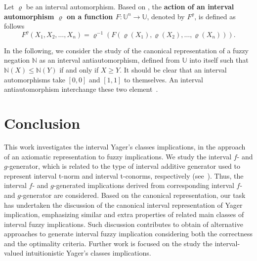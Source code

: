 \documentclass[conference]{IEEEtran}
\theoremstyle{plain}
\theoremstyle{remark}
\theoremstyle{definition}
\theoremstyle{proposition}
\begin{document}
Let $\varrho$ be an interval automorphism. Based on
\cite{BT06a,BDSR10}, the \textbf{action of an interval
automorphism $\varrho$ on a function $F: \mathbb{U}^{n}\rightarrow
\mathbb{U}$}, denoted by $F^{\varrho}$, is defined as follows
\begin{equation} \label{eq-aut-imp-int}
F^\varrho(X_1,X_2, \ldots
,X_n)=\varrho^{-1}(F(\varrho(X_1),\varrho(X_2), \ldots
,\varrho(X_n))).
\end{equation}

In the following, we consider the study of the canonical
representation of a fuzzy negation $\mathbb{N}$ as an interval
antiautomorphism, defined from $\mathbb{U}$ into itself such that
$\mathbb{N}(X)\leq \mathbb{N}(Y)$ if and only if $X \geq Y$. It
should be clear that an interval automorphisms take $[0,0]$ and
$[1,1]$ to themselves. An interval antiautomorphism interchange
these two element~\cite{Ngu06}.


\section{Conclusion}\label{sec-conc}

This work investigates the interval Yager's classes implications, in the approach of an axiomatic representation to fuzzy implications.  We study the interval $f$- and $g$-generator, which is related to the type of interval additive generator used to represent interval t-norm and interval t-conorms, respectively (see~\cite{BDSR11}). Thus, the interval $f$- and $g$-generated implications derived from corresponding interval $f$- and $g$-generator are considered. Based on the canonical representation, our task has undertaken the discussion of the canonical interval representation of  Yager implication, emphasizing similar and extra properties of related main classes of interval fuzzy implications. Such discussion contributes to obtain of alternative approaches to generate interval fuzzy implication considering both the correctness and the optimality criteria. Further work is focused on the study the interval-valued intuitionistic Yager's classes implications.\vspace{-0.5cm}

\vspace{-1mm}


\end{document}
